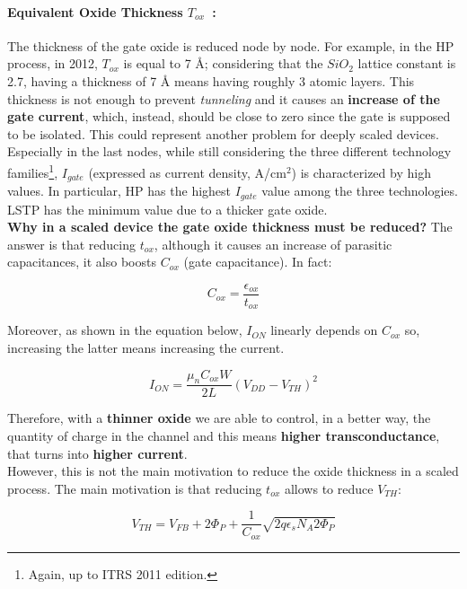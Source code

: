\documentclass[a4paper, 12pt, twoside, openright]{report}
\begin{document}
\paragraph{Equivalent Oxide Thickness $T_{ox}$~:} The thickness of the gate oxide is reduced node by node. For example, in the HP process, in 2012, $T_{ox}$ is equal to 7 \r{A}; considering that the $SiO_{2}$ lattice constant is 2.7, having a thickness of 7 \r{A} means having roughly 3 atomic layers. This thickness is not enough to prevent \emph{tunneling} and it causes an \textbf{increase of the gate current}, which, instead, should be close to zero since the gate is supposed to be isolated. This could represent another problem for deeply scaled devices.\\
Especially in the last nodes, while still considering the three different technology families\footnote{Again, up to ITRS 2011 edition.}, $I_{gate}$ (expressed as current density, A/cm$^{2}$) is characterized by high values. In particular, HP has the highest $I_{gate}$ value among the three technologies. LSTP has the minimum value due to a thicker gate oxide.\\
\textbf{Why in a scaled device the gate oxide thickness must be reduced?} The answer is that reducing $t_{ox}$, although it causes an increase of parasitic capacitances, it also boosts $C_{ox}$ (gate capacitance). In fact:

\begin{equation}
C_{ox} = \frac{\epsilon_{ox}}{t_{ox}}
\label{}
\end{equation}

Moreover, as shown in the equation below, $I_{ON}$ linearly depends on $C_{ox}$ so, increasing the latter means increasing the current.

\begin{equation}
I_{ON} = \frac{\mu_n C_{ox} W}{2 L} (V_{DD} - V_{TH})^2
\label{}
\end{equation}

Therefore, with a \textbf{thinner oxide} we are able to control, in a better way, the quantity of charge in the channel and this means \textbf{higher transconductance}, that turns into \textbf{higher current}.\\
However, this is not the main motivation to reduce the oxide thickness in a scaled process. The main motivation is that reducing $t_{ox}$ allows to reduce $V_{TH}$:

\begin{equation}
V_{TH} = V_{FB} + 2 \Phi_{P} + \frac{1}{C_{ox}} \sqrt{2 q \epsilon_s N_A 2 \Phi_{P}}
\label{V_th}
\end{equation}
\end{document}
